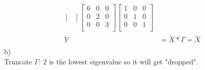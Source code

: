 \begin{flushleft}
\begin{align*}
\begin{bmatrix}
\end{bmatrix}
\begin{bmatrix}
6 & 0 & 0 \\
0 & 2 & 0 \\
0 & 0 & 3 \\
\end{bmatrix}
\begin{bmatrix}
1 & 0 & 0 \\
0 & 1 & 0 \\
0 & 0 & 1 \\
\end{bmatrix}
\\
Y &= \widetilde{X} * \Gamma = \widetilde{X}
\\
\end{align*}
b)
\\
Truncate $\Gamma$: $2$ is the lowest eigenvalue so it will get "dropped". 
\\


\end{flushleft}
